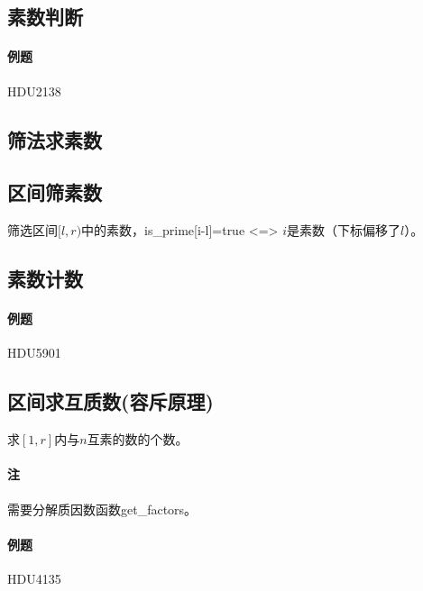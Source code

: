 \subsection{素数判断}

\paragraph{例题} HDU2138



\subsection{筛法求素数}


\subsection{区间筛素数}

筛选区间$[l,r)$中的素数，is\_prime[i-l]=true <=> $i$是素数（下标偏移了$l$）。



\subsection{素数计数}

\paragraph{例题} HDU5901



\subsection{区间求互质数(容斥原理)}

求$[1,r]$内与$n$互素的数的个数。

\paragraph{注} 需要分解质因数函数get\_factors。

\paragraph{例题} HDU4135

